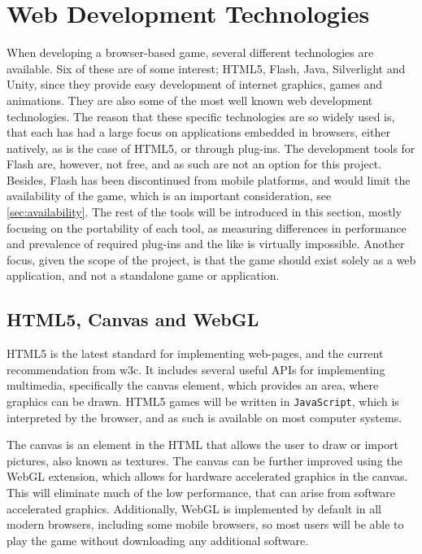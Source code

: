 \section{Web Development Technologies}
\label{sec:tools}
When developing a browser-based game, several different technologies are available.
Six of these are of some interest; HTML5, Flash, Java, Silverlight and Unity, since they provide easy development of internet graphics, games and animations.
They are also some of the most well known web development technologies.
The reason that these specific technologies are so widely used is, that each has had a large focus on applications embedded in browsers, either natively, as is the case of HTML5, or through plug-ins.
The development tools for Flash are, however, not free, and as such are not an option for this project.\cite{adobe13}
Besides, Flash has been discontinued from mobile platforms,\cite{adobe12} and would limit the availability of the game, which is an important consideration, see \autoref{sec:availability}.
The rest of the tools will be introduced in this section, mostly focusing on the portability of each tool, as measuring differences in performance and prevalence of required plug-ins and the like is virtually impossible.
Another focus, given the scope of the project, is that the game should exist solely as a web application, and not a standalone game or application.

\subsection{HTML5, Canvas and WebGL}
HTML5 is the latest standard for implementing web-pages, and the current recommendation from \ac{w3c}.\cite{html513}
It includes several useful APIs for implementing multimedia, specifically the canvas element, which provides an area, where graphics can be drawn.
HTML5 games will be written in \texttt{JavaScript}, which is interpreted by the browser, and as such is available on most computer systems.\newline

The canvas is an element in the HTML that allows the user to draw or import pictures, also known as textures.
The canvas can be further improved using the WebGL extension, which allows for hardware accelerated graphics in the canvas.\cite{khronos13}
This will eliminate much of the low performance, that can arise from software accelerated graphics.
Additionally, WebGL is implemented by default in all modern browsers, including some mobile browsers, so most users will be able to play the game without downloading any additional software.


